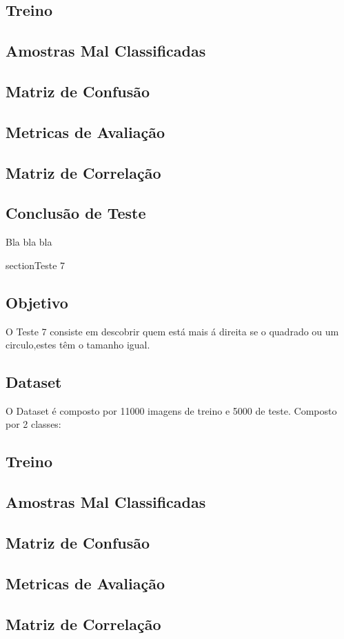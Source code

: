 \subsection{Treino}
\subsection{Amostras Mal Classificadas}
\subsection{Matriz de Confusão}
\subsection{Metricas de Avaliação}
\subsection{Matriz de Correlação}
\subsection{Conclusão de Teste}
    Bla bla bla

section{Teste 7}
\subsection{Objetivo}
    O Teste 7 consiste em descobrir quem está mais á direita se o quadrado ou um circulo,estes têm o tamanho igual.
\subsection{Dataset}
O Dataset é composto por 11000 imagens de treino e 5000 de teste. Composto por 2 classes:
\subsection{Treino}
\subsection{Amostras Mal Classificadas}
\subsection{Matriz de Confusão}
\subsection{Metricas de Avaliação}
\subsection{Matriz de Correlação}
